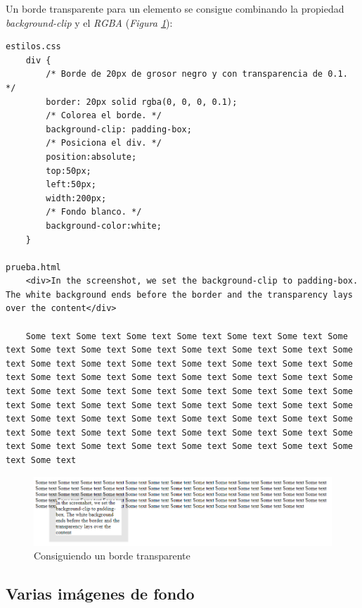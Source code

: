 Un borde transparente para un elemento se consigue combinando la propiedad \textit{background-clip} y el \textit{RGBA} (\textit{Figura \ref{fig: 49}}):
\begin{lstlisting}
estilos.css
    div {
        /* Borde de 20px de grosor negro y con transparencia de 0.1. */
        border: 20px solid rgba(0, 0, 0, 0.1);
        /* Colorea el borde. */
        background-clip: padding-box; 
        /* Posiciona el div. */
        position:absolute;
        top:50px;
        left:50px;
        width:200px;
        /* Fondo blanco. */
        background-color:white;
    }

prueba.html
    <div>In the screenshot, we set the background-clip to padding-box. The white background ends before the border and the transparency lays over the content</div>

    Some text Some text Some text Some text Some text Some text Some text Some text Some text Some text Some text Some text Some text Some text Some text Some text Some text Some text Some text Some text Some text Some text Some text Some text Some text Some text Some text Some text Some text Some text Some text Some text Some text Some text Some text Some text Some text Some text Some text Some text Some text Some text Some text Some text Some text Some text Some text Some text Some text Some text Some text Some text Some text Some text Some text Some text Some text Some text Some text Some text Some text Some text Some text Some text
\end{lstlisting}
\begin{figure}[H]
    \centering
    \caption{Consiguiendo un borde transparente}
    \label{fig: 49}
    \includegraphics[width=12cm]{ss/borde-transparente.png}
\end{figure}


\subsection{Varias imágenes de fondo}


